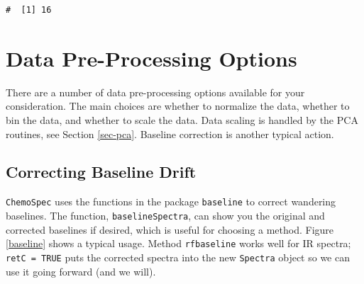 \documentclass[letter,10pt,twocolumn,twoside,printwatermark=false]{pinp}
\begin{document}
\begin{ShadedResult}
\begin{verbatim}
#  [1] 16
\end{verbatim}
\end{ShadedResult}

\hypertarget{data-pre-processing-options}{%
\section{Data Pre-Processing
Options}\label{data-pre-processing-options}}

There are a number of data pre-processing options available for your
consideration. The main choices are whether to normalize the data,
whether to bin the data, and whether to scale the data. Data scaling is
handled by the PCA routines, see Section \ref{sec-pca}. Baseline
correction is another typical action.

\hypertarget{correcting-baseline-drift}{%
\subsection{Correcting Baseline Drift}\label{correcting-baseline-drift}}

\texttt{ChemoSpec} uses the functions in the package \texttt{baseline}
to correct wandering baselines. The function, \texttt{baselineSpectra},
can show you the original and corrected baselines if desired, which is
useful for choosing a method. Figure \ref{baseline} shows a typical
usage. Method \texttt{rfbaseline} works well for IR spectra;
\texttt{retC = TRUE} puts the corrected spectra into the new
\texttt{Spectra} object so we can use it going forward (and we will).

\begin{Shaded}
\begin{Highlighting}[]
\StringTok{ }
   \NormalTok{,}
   \NormalTok{,}
   \NormalTok{)}
\end{Highlighting}
\end{Shaded}
\end{document}

